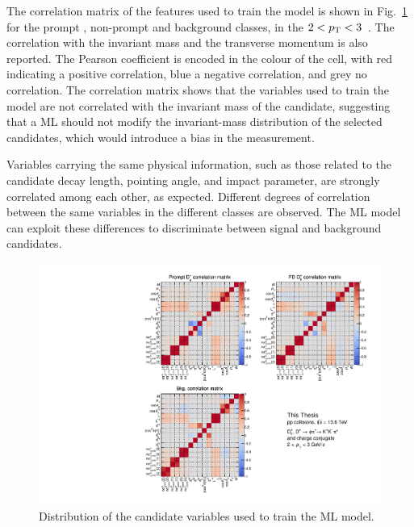 The correlation matrix of the features used to train the model is shown in Fig.~\ref{fig:ml_training_vars} for the prompt \ds, non-prompt \ds and background classes, in the $2<p\mathrm{_T}<3$~\gevc. The correlation with the invariant mass and the transverse momentum is also reported. The Pearson coefficient is encoded in the colour of the cell, with red indicating a positive correlation, blue a negative correlation, and grey no correlation. The correlation matrix shows that the variables used to train the model are not correlated with the invariant mass of the candidate, suggesting that a ML should not modify the invariant-mass distribution of the selected candidates, which would introduce a bias in the measurement.

Variables carrying the same physical information, such as those related to the candidate decay length, pointing angle, and impact parameter, are strongly correlated among each other, as expected. Different degrees of correlation between the same variables in the different classes are observed. The ML model can exploit these differences to discriminate between signal and background candidates.

\begin{figure}[htb]
    \centering
    \includegraphics[width=\textwidth]{Figures/Chapter 5/CorrelationMatrix.pdf}
    \caption{Distribution of the candidate variables used to train the ML model.}
    \label{fig:ml_training_vars}
\end{figure}

